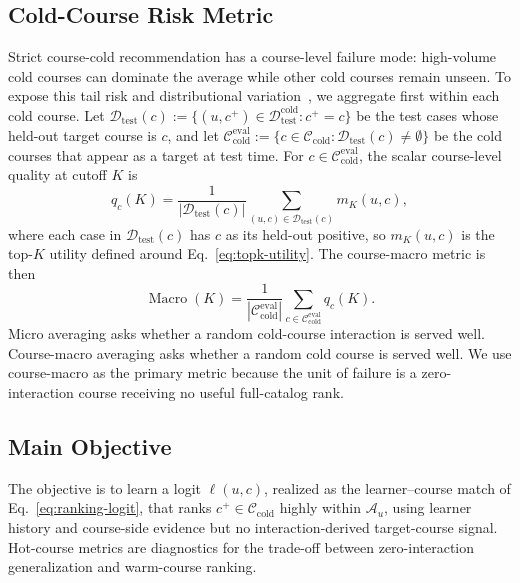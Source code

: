 \documentclass[letterpaper]{article}
\begin{document}
\subsection{Cold-Course Risk Metric}
Strict course-cold recommendation has a course-level failure mode: high-volume cold courses can dominate the average while other cold courses remain unseen. To expose this tail risk and distributional variation~\cite{ekstrand2024distributional,takehi2025diversification}, we aggregate first within each cold course. Let \(\mathcal{D}_{\mathrm{test}}(c):=\{(u,c^+)\in\mathcal{D}^{\mathrm{cold}}_{\mathrm{test}}:c^+=c\}\) be the test cases whose held-out target course is \(c\), and let \(\mathcal{C}^{\mathrm{eval}}_{\mathrm{cold}}:=\{c\in\mathcal{C}_{\mathrm{cold}}:\mathcal{D}_{\mathrm{test}}(c)\neq\emptyset\}\) be the cold courses that appear as a target at test time. For \(c\in\mathcal{C}^{\mathrm{eval}}_{\mathrm{cold}}\), the scalar course-level quality at cutoff \(K\) is
\begin{equation}
q_c(K)=
\frac{1}{|\mathcal{D}_{\mathrm{test}}(c)|}
\sum_{(u,c)\in \mathcal{D}_{\mathrm{test}}(c)}
m_K(u,c),
\end{equation}
where each case in \(\mathcal{D}_{\mathrm{test}}(c)\) has \(c\) as its held-out positive, so \(m_K(u,c)\) is the top-\(K\) utility defined around Eq.~\eqref{eq:topk-utility}. The course-macro metric is then
\begin{equation}
\operatorname{Macro}(K)=
\frac{1}{|\mathcal{C}^{\mathrm{eval}}_{\mathrm{cold}}|}
\sum_{c\in\mathcal{C}^{\mathrm{eval}}_{\mathrm{cold}}} q_c(K).
\end{equation}
Micro averaging asks whether a random cold-course interaction is served well. Course-macro averaging asks whether a random cold course is served well. We use course-macro as the primary metric because the unit of failure is a zero-interaction course receiving no useful full-catalog rank.

\subsection{Main Objective}
The objective is to learn a logit \(\ell(u,c)\), realized as the learner--course match of Eq.~\eqref{eq:ranking-logit}, that ranks \(c^+\in\mathcal{C}_{\mathrm{cold}}\) highly within \(\mathcal{A}_u\), using learner history and course-side evidence but no interaction-derived target-course signal. Hot-course metrics are diagnostics for the trade-off between zero-interaction generalization and warm-course ranking.
\end{document}
